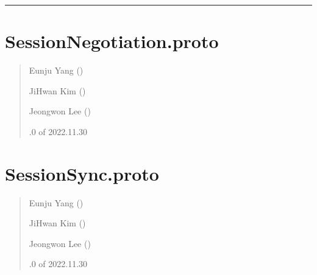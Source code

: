 \documentclass[a4paper,10pt,english]{sphinxmanual}
\begin{document}
\bigskip\hrule\bigskip


\sphinxstepscope


\section{SessionNegotiation.proto}
\label{\detokenize{_SessionNegotiationProto:sessionnegotiation-proto}}\label{\detokenize{_SessionNegotiationProto:sessionnegotiationproto}}\label{\detokenize{_SessionNegotiationProto::doc}}\begin{quote}\begin{description}
\begin{DUlineblock}{0em}
\item[] Eunju Yang ()
\item[] JiHwan Kim ()
\item[] Jeongwon Lee ()
\end{DUlineblock}

.0 of 2022.11.30

\end{description}\end{quote}

\sphinxstepscope


\section{SessionSync.proto}
\label{\detokenize{_SessionSyncProto:sessionsync-proto}}\label{\detokenize{_SessionSyncProto:sessionsyncproto}}\label{\detokenize{_SessionSyncProto::doc}}\begin{quote}\begin{description}
\begin{DUlineblock}{0em}
\item[] Eunju Yang ()
\item[] JiHwan Kim ()
\item[] Jeongwon Lee ()
\end{DUlineblock}

.0 of 2022.11.30

\end{description}\end{quote}
\end{document}
